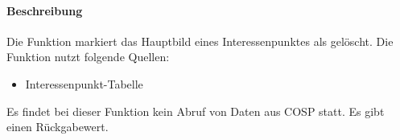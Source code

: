 \paragraph{Beschreibung} Die Funktion markiert das Hauptbild eines Interessenpunktes als gelöscht. Die Funktion nutzt folgende Quellen:
\begin{itemize}
	\item Interessenpunkt-Tabelle
\end{itemize}
Es findet bei dieser Funktion kein Abruf von Daten aus {\glqq COSP\grqq} statt. Es gibt einen Rückgabewert.